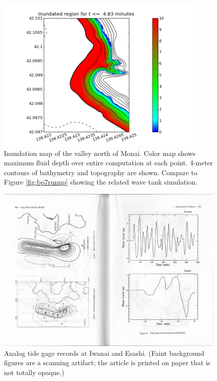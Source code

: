 \begin{figure}[ht]
\hfil\includegraphics[width=4.0in]{bp9/in_monai_friction.png}\hfil
\caption{\label{bp9monai}
Inundation map of the valley north of Monai.  Color map shows maximum fluid depth over entire computation at each point. 4-meter contours of bathymetry and topography are shown. Compare to Figure \protect\ref{fig:bp7runup} showing the related wave tank simulation.
  }
\end{figure}

\begin{figure}[ht]
\hfil\includegraphics[width=5.0in]{bp9/TGs-Takahashi.pdf}\hfil
\caption{\label{TGs-Takahashi}
Analog tide gage records at Iwanai and Esashi.  (Faint background figures are a scanning artifact; the article is printed on paper that is not totally opaque.) 
  }
\end{figure}


